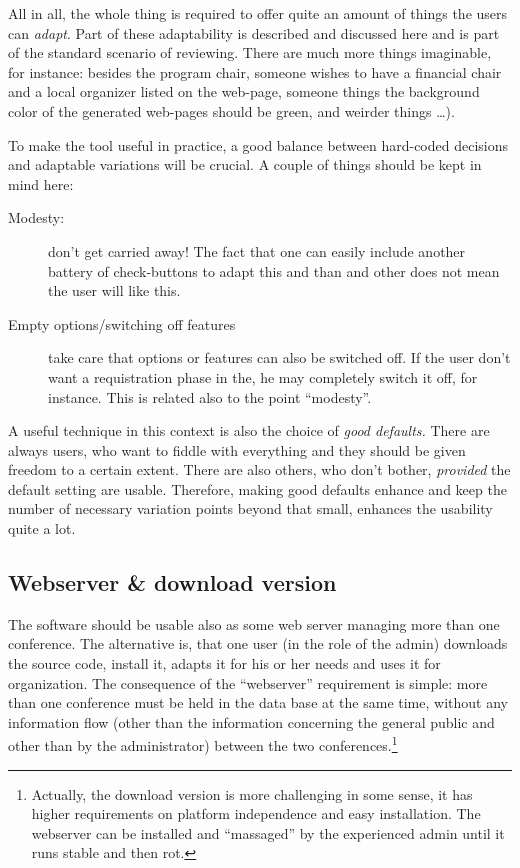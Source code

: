 All in all, the whole thing is required to offer quite an amount of things
the users can \emph{adapt}. Part of these adaptability is described and
discussed here and is part of the standard scenario of reviewing. There are
much more things imaginable, for instance: besides the program chair,
someone wishes to have a financial chair and a local organizer listed on
the web-page, someone things the background color of the generated
web-pages should be green, and weirder things \ldots).

To make the tool useful in practice, a good balance between hard-coded
decisions and adaptable variations will be crucial. A couple of things
should be kept in mind here:
\begin{description}
\item[Modesty:] don't get carried away! The fact that one can easily
  include another battery of check-buttons to adapt this and than and other
  does not mean the user will like this. 
\item[Empty options/switching off features] take care that options or
  features can also be switched off. If the user don't want a requistration
  phase in the, he may completely switch it off, for instance. This is
  related also to the point ``modesty''.
\end{description}

A useful technique in this context is also the choice of \emph{good
  defaults.} There are always users, who want to fiddle with everything and
they should be given freedom to a certain extent. There are also others,
who don't bother, \emph{provided} the default setting are usable.
Therefore, making good defaults enhance and keep the number of necessary
variation points beyond that small, enhances the usability quite a lot.








\subsection{Webserver \& download version}
\label{sec:uses}


The software should be usable also as some web server managing more than
one conference. The alternative is, that one user (in the role of the
admin) downloads the source code, install it, adapts it for his or her
needs and uses it for organization.  The consequence of the ``webserver''
requirement is simple: more than one conference must be held in the data
base at the same time, without any information flow (other than the
information concerning the general public and other than by the
administrator) between the two conferences.\footnote{Actually, the download
  version is more challenging in some sense, it has higher requirements on
  platform independence and easy installation. The webserver can be
  installed and ``massaged'' by the experienced admin until it runs
  stable and then rot.}




